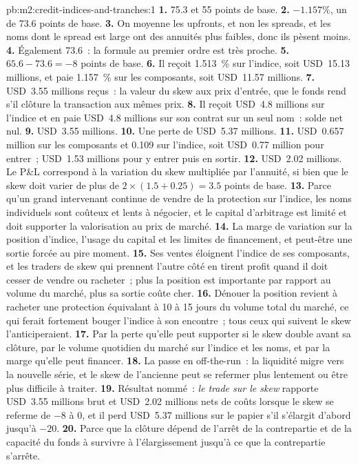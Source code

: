 \begin{solution}{pb:m2:credit-indices-and-tranches:1}
\textbf{1.} 75.3 et 55 points de base.
\textbf{2.} $-1.157\%$, un  de 73.6 points de base.
\textbf{3.} On moyenne les upfronts, et non les spreads, et les noms dont le spread est large ont des
annuités plus faibles, donc ils pèsent moins.
\textbf{4.} Également 73.6~: la formule au premier ordre est très proche.
\textbf{5.} $65.6 - 73.6 = -8$ points de base.
\textbf{6.} Il reçoit 1.513~\% sur l'indice, soit USD~15.13 millions, et paie 1.157~\% sur les
composants, soit USD~11.57 millions.
\textbf{7.} USD~3.55 millions reçus~: la valeur du skew aux prix d'entrée,
que le fonds rend s'il clôture la transaction aux mêmes prix.
\textbf{8.} Il reçoit USD~4.8 millions sur l'indice et en paie USD~4.8 millions sur son
contrat sur un seul nom~: solde net nul.
\textbf{9.} USD~3.55 millions.
\textbf{10.} Une perte de USD~5.37 millions.
\textbf{11.} USD~0.657 million sur les composants et 0.109 sur l'indice, soit USD~0.77
million pour entrer~; USD~1.53 millions pour y entrer puis en sortir.
\textbf{12.} USD~2.02 millions. Le P\&L correspond à la variation du skew multipliée par l'annuité,
si bien que le skew doit varier de plus de $2 \times (1.5 + 0.25) = 3.5$ points de base.
\textbf{13.} Parce qu'un grand intervenant continue de vendre de la protection sur l'indice, les noms
individuels sont coûteux et lents à négocier, et le capital d'arbitrage est limité et doit supporter la
valorisation au prix de marché.
\textbf{14.} La marge de variation sur la position d'indice, l'usage du capital et les limites
de financement, et peut-être une sortie forcée au pire moment.
\textbf{15.} Ses ventes éloignent l'indice de ses composants, et les traders de skew qui
prennent l'autre côté en tirent profit quand il doit cesser de vendre ou racheter~; plus la
position est importante par rapport au volume du marché, plus sa sortie coûte cher.
\textbf{16.} Dénouer la position revient à racheter une protection équivalant à 10 à 15 jours du volume
total du marché, ce qui ferait fortement bouger l'indice à son encontre~; tous ceux qui suivent
le skew l'anticiperaient.
\textbf{17.} Par la perte qu'elle peut supporter si le skew double avant sa clôture, par le
volume quotidien du marché sur l'indice et les noms, et par la marge qu'elle peut financer.
\textbf{18.} La  passe en off-the-run~: la liquidité migre vers la nouvelle série, et
le skew de l'ancienne peut se refermer plus lentement ou être plus difficile à traiter.
\textbf{19.} Résultat nommé~: \emph{le trade sur le skew} rapporte USD~3.55 millions brut et
USD~2.02 millions nets de coûts lorsque le skew se referme de $-8$ à 0, et il perd USD~5.37
millions sur le papier s'il s'élargit d'abord jusqu'à $-20$.
\textbf{20.} Parce que la clôture dépend de l'arrêt de la contrepartie et de la capacité du fonds
à survivre à l'élargissement jusqu'à ce que la contrepartie s'arrête.
\end{solution}

